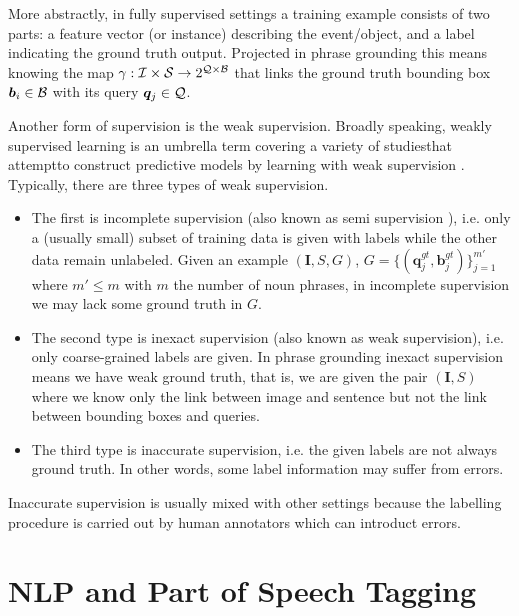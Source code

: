 More abstractly, in fully supervised settings a training example
consists of two parts: a feature vector (or instance) describing the
event/object, and a label indicating the ground truth output.
Projected in phrase grounding this means knowing the map $\gamma :
\mathcal{I} \times \mathcal{S} \rightarrow 2^{\mathcal{Q} \times \mathcal{B}}$ that links the
ground truth bounding box $\bm{b}_i \in \mathcal{B}$ with its query
$\bm{q}_j \in \mathcal{Q}$.

Another form of supervision is the weak supervision. Broadly speaking,
weakly supervised learning is an umbrella term covering a variety of
studiesthat attemptto construct predictive models by learning with
weak supervision \cite{zhou2018brief}. Typically, there are three
types of weak supervision. 

\begin{itemize}
  \item The first is incomplete supervision (also known as semi
supervision \cite{rohrbach2016grounding}), i.e. only a (usually small)
subset of training data is given with labels while the other data
remain unlabeled. Given an example $(\bm{I}, S, G)$, $G = \{
(\bm{q}^{gt}_j, \bm{b}^{gt}_j) \}^{m'}_{j=1}$ where $m' \leq m$ with
$m$ the number of noun phrases, in incomplete supervision we may lack
some ground truth in $G$.
  \item The second type is inexact supervision (also known as weak
supervision), i.e. only coarse-grained labels are given. In phrase
grounding inexact supervision means we have weak ground truth, that
is, we are given the pair $(\bm{I}, S)$ where we know only the link
between image and sentence but not the link between bounding boxes and
queries.
  \item The third type is inaccurate supervision, i.e. the given
labels are not always ground truth. In other words, some label
information may suffer from errors.
\end{itemize}

Inaccurate supervision is usually mixed with other settings because
the labelling procedure is carried out by human annotators which can
introduct errors.

\section{NLP and Part of Speech Tagging}

